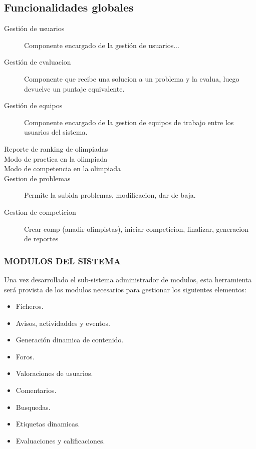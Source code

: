 \subsection{Funcionalidades globales}
\begin{description}
    \item[Gestión de usuarios]
    Componente encargado de la gestión de usuarios...
    \item[Gestión de evaluacion]
    Componente que recibe una solucion a un problema y la evalua, luego devuelve un puntaje equivalente.
    \item[Gestión de equipos] %
    Componente encargado de la gestion de equipos de trabajo entre los
    usuarios del sistema.
    \item[]
    \item[]
    \item[Reporte de ranking de olimpiadas]
    \item[Modo de practica en la olimpiada]
    \item[Modo de competencia en la olimpiada]
    \item[Gestion de problemas]
    Permite la subida problemas, modificacion, dar de baja.
    \item[Gestion de competicion]
    Crear comp (anadir olimpistas), iniciar competicion, finalizar, generacion de reportes
\end{description}

\subsubsection{MODULOS DEL SISTEMA}
Una vez desarrollado el sub-sistema administrador de modulos, esta
herramienta será provista de los modulos necesarios para gestionar
los siguientes elementos:
\begin{itemize}
    \item Ficheros.
    \item Avisos, actividaddes y eventos.
    \item Generación dinamica de contenido.
    \item Foros.
    \item Valoraciones de usuarios.
    \item Comentarios.
    \item Busquedas.
    \item Etiquetas dinamicas.
    \item Evaluaciones y calificaciones.
\end{itemize}


